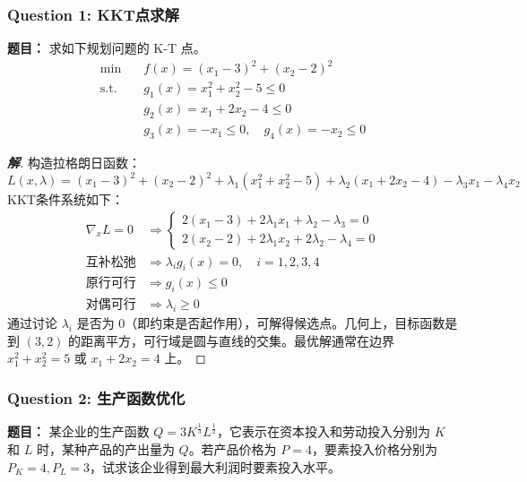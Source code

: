 \documentclass[a4paper,12pt]{ctexart} %
\newenvironment{solution}{\begin{proof}[\textbf{解}]}{\end{proof}}
\begin{document}
	\subsubsection*{Question 1: KKT点求解}
	\textbf{题目：} 求如下规划问题的 K-T 点。
	\[
	\begin{aligned}
		\min \quad & f(x) = (x_1-3)^2 + (x_2-2)^2 \\
		\text{s.t.} \quad & g_1(x) = x_1^2 + x_2^2 - 5 \le 0 \\
		& g_2(x) = x_1 + 2x_2 - 4 \le 0 \\
		& g_3(x) = -x_1 \le 0, \quad g_4(x) = -x_2 \le 0
	\end{aligned}
	\]
	
	\begin{solution}
		构造拉格朗日函数：
		\[ L(x, \lambda) = (x_1-3)^2 + (x_2-2)^2 + \lambda_1(x_1^2+x_2^2-5) + \lambda_2(x_1+2x_2-4) - \lambda_3 x_1 - \lambda_4 x_2 \]
		KKT条件系统如下：
		\begin{align}
			\nabla_x L = 0 & \Rightarrow \begin{cases} 2(x_1-3) + 2\lambda_1 x_1 + \lambda_2 - \lambda_3 = 0 \\ 2(x_2-2) + 2\lambda_1 x_2 + 2\lambda_2 - \lambda_4 = 0 \end{cases} \\
			\text{互补松弛} & \Rightarrow \lambda_i g_i(x) = 0, \quad i=1,2,3,4 \\
			\text{原行可行} & \Rightarrow g_i(x) \le 0 \\
			\text{对偶可行} & \Rightarrow \lambda_i \ge 0
		\end{align}
		通过讨论 $\lambda_i$ 是否为 0（即约束是否起作用），可解得候选点。几何上，目标函数是到 $(3,2)$ 的距离平方，可行域是圆与直线的交集。最优解通常在边界 $x_1^2+x_2^2=5$ 或 $x_1+2x_2=4$ 上。
	\end{solution}
	
	\subsubsection*{Question 2: 生产函数优化}
	\textbf{题目：} 某企业的生产函数 $Q=3K^{\frac{1}{3}}L^{\frac{1}{2}}$，它表示在资本投入和劳动投入分别为 $K$ 和 $L$ 时，某种产品的产出量为 $Q$。若产品价格为 $P=4$，要素投入价格分别为 $P_K=4, P_L=3$，试求该企业得到最大利润时要素投入水平。
	
\end{document}
